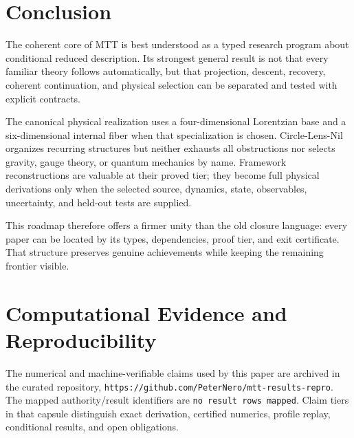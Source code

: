 \documentclass[11pt]{article}
\begin{document}
\section{Conclusion}

The coherent core of MTT is best understood as a typed research program about
conditional reduced description.  Its strongest general result is not that
every familiar theory follows automatically, but that projection, descent,
recovery, coherent continuation, and physical selection can be separated and
tested with explicit contracts.

The canonical physical realization uses a four-dimensional Lorentzian base
and a six-dimensional internal fiber when that specialization is chosen.
Circle-Lens-Nil organizes recurring structures but neither exhausts all
obstructions nor selects gravity, gauge theory, or quantum mechanics by name.
Framework reconstructions are valuable at their proved tier; they become full
physical derivations only when the selected source, dynamics, state,
observables, uncertainty, and held-out tests are supplied.

This roadmap therefore offers a firmer unity than the old closure language:
every paper can be located by its types, dependencies, proof tier, and exit
certificate.  That structure preserves genuine achievements while keeping the
remaining frontier visible.

\begingroup
\raggedright


\endgroup

\section*{Computational Evidence and Reproducibility}
The numerical and machine-verifiable claims used by this paper are archived in the curated repository, \texttt{https://github.com/PeterNero/mtt-results-repro}. The mapped authority/result identifiers are \texttt{no result rows mapped}. Claim tiers in that capsule distinguish exact derivation, certified numerics, profile replay, conditional results, and open obligations.
\end{document}
